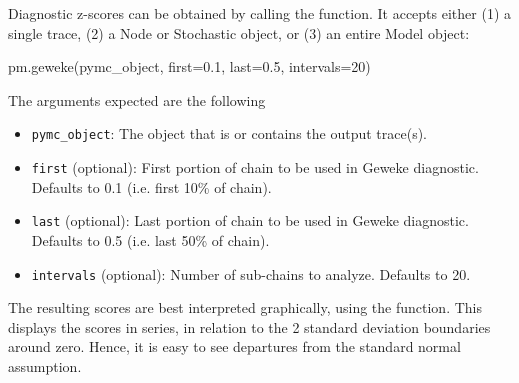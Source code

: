 \documentclass[]{jss}
\begin{document}
Diagnostic z-scores can be obtained by calling the  function. It accepts either (1) a single trace, (2) a Node or Stochastic object, or (3) an entire Model object:
\begin{CodeInput}
pm.geweke(pymc_object, first=0.1, last=0.5, intervals=20)
\end{CodeInput}
The arguments expected are the following
\begin{itemize}

\item \verb=pymc_object=: The object that is or contains the output trace(s).

\item \verb=first= (optional): First portion of chain to be used in Geweke diagnostic. Defaults to 0.1 (i.e. first 10\% of chain).

\item \verb=last= (optional): Last portion of chain to be used in Geweke diagnostic. Defaults to 0.5 (i.e. last 50\% of chain).

\item \verb=intervals= (optional): Number of sub-chains to analyze. Defaults to 20.
\end{itemize}

The resulting scores are best interpreted graphically, using the  function. This displays the scores in series, in relation to the 2 standard deviation boundaries around zero. Hence, it is easy to see departures from the standard normal assumption.
\end{document}
